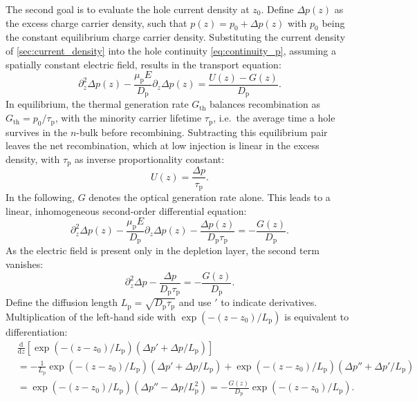 The second goal is to evaluate the hole current density at $z_{0}$. Define $\Delta
p(z)$ as the excess charge carrier density, such that
$p(z) = p_{0}+ \Delta p(z)$ with $p_{0}$ being the constant equilibrium charge
carrier density. Substituting the current density of \cref{sec:current_density} into
the hole continuity \cref{eq:continuity_p}, assuming a spatially constant
electric field, results in the transport equation:
\begin{equation}
	\partial^{2}_{z}\Delta p(z)-\frac{\mu_{\mathrm{p}}E}{D_{\mathrm{p}}}\partial_{z}
	\Delta p(z) = \frac{U(z)-G(z)}{D_{\mathrm{p}}}.
\end{equation}
In equilibrium, the thermal generation rate $G_{\mathrm{th}}$ balances recombination
as $G_{\mathrm{th}}=p_{0}/ \tau_{\mathrm{p}}$, with the minority carrier
lifetime $\tau_{\mathrm{p}}$, i.e.\ the average time a hole survives in the $n$-bulk
before recombining. Subtracting this equilibrium pair leaves the net recombination,
which at low injection is linear in the excess density, with $\tau_{\mathrm{p}}$ as
inverse proportionality constant:
\begin{equation}
	U(z)=\frac{\Delta p}{\tau_{\mathrm{p}}}.
\end{equation}
In the following, $G$ denotes the optical generation rate alone. This leads to a
linear, inhomogeneous second-order differential equation:
\begin{equation}
	\partial_{z}^{2}\Delta p(z)-\frac{\mu_{\mathrm{p}}E}{D_{\mathrm{p}}}\partial_{z}
	\Delta p(z) -\frac{\Delta p(z)}{D_{\mathrm{p}}\tau_{\mathrm{p}}}=-\frac{G(z)}{D_{\mathrm{p}}}
	.
\end{equation}
As the electric field is present only in the depletion layer, the second term vanishes:
\begin{equation}
	\partial_{z}^{2}\Delta p-\frac{\Delta p}{D_{\mathrm{p}}\tau_{\mathrm{p}}}=-\frac{G(z)}{D_{\mathrm{p}}}
	. \label{eq:transport_bulk}
\end{equation}
Define the diffusion length
$L_{\mathrm{p}}=\sqrt{ D_{\mathrm{p}}\tau_{\mathrm{p}}}$ and use $'$ to indicate
derivatives. Multiplication of the left-hand side with $\exp(-(z-z_{0})/L_{\mathrm{p}}
)$ is equivalent to differentiation:
\begin{equation}
	\begin{split}
		&\frac{\mathrm{d}}{\mathrm{d}z}\left[ \exp(-(z-z_{0})/L_{\mathrm{p}}) (\Delta
		p'+\Delta p/L_{\mathrm{p}}) \right] \\&= -\frac{1}{L_{\mathrm{p}}}\exp(-(z-z_{0}
		) /L_{\mathrm{p}})(\Delta p'+\Delta p/L_{\mathrm{p}}) +\exp(-(z-z_{0})/L_{\mathrm{p}}
		) (\Delta p''+\Delta p'/L_{\mathrm{p}}) \\&= \exp(-(z-z_{0})/L_{\mathrm{p}}) (
		\Delta p''-\Delta p/L_{\mathrm{p}}^{2}) = -\frac{G(z)}{D_{\mathrm{p}}}\exp(-(
		z-z_{0})/L_{\mathrm{p}}).
	\end{split}
\end{equation}
